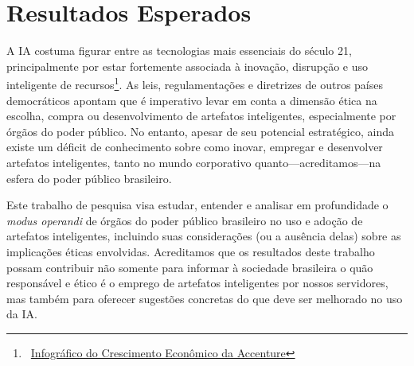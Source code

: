 \documentclass[12pt]{article}
\begin{document}




\section{Resultados Esperados}

A IA costuma figurar entre as tecnologias mais essenciais do século 21, principalmente por estar fortemente associada à inovação, disrupção e uso inteligente de recursos\footnote{~\href{https://www.accenture.com/\_acnmedia/PDF-57/Accenture-AI-Economic-Growth-Infographic.pdf}{Infográfico do Crescimento Econômico da Accenture}}. As leis, regulamentações e diretrizes de outros países democráticos apontam que é imperativo levar em conta a dimensão ética na escolha, compra ou desenvolvimento de artefatos inteligentes, especialmente por órgãos do poder público. No entanto, apesar de seu potencial estratégico, ainda existe um déficit de conhecimento sobre como inovar, empregar e desenvolver artefatos inteligentes, tanto no mundo corporativo \cite{Pew2018} quanto---acreditamos---na esfera do poder público brasileiro.

Este trabalho de pesquisa visa estudar, entender e analisar em profundidade o \textit{modus operandi} de órgãos do poder público brasileiro no uso e adoção de artefatos inteligentes, incluindo suas considerações (ou a ausência delas) sobre as implicações éticas envolvidas. Acreditamos que os resultados deste trabalho possam contribuir não somente para informar à sociedade brasileira o quão responsável e ético é o emprego de artefatos inteligentes por nossos servidores, mas também para oferecer sugestões concretas do que deve ser melhorado no uso da IA.



\end{document}

